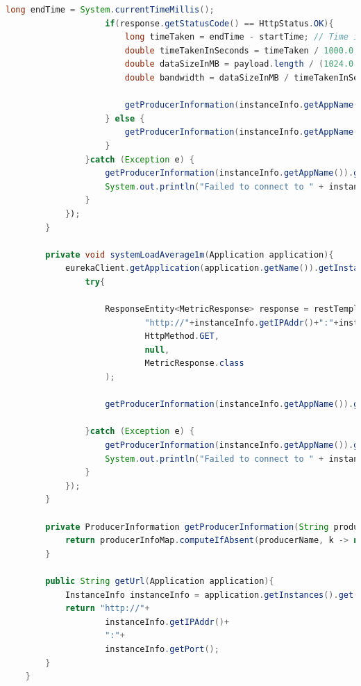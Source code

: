 \begin{lstlisting}[language=Java, caption=Kod usługi ProducerInfoService,label=ProducerInfoServiceCode]
                    long endTime = System.currentTimeMillis();
                    if(response.getStatusCode() == HttpStatus.OK){
                        long timeTaken = endTime - startTime; // Time in milliseconds
                        double timeTakenInSeconds = timeTaken / 1000.0;
                        double dataSizeInMB = payload.length / (1024.0 * 1024.0);
                        double bandwidth = dataSizeInMB / timeTakenInSeconds; // MB/s
    
                        getProducerInformation(instanceInfo.getAppName()).getMeasurementBufferConnectionSpeed().addMeasurement(bandwidth);
                    } else {
                        getProducerInformation(instanceInfo.getAppName()).getMeasurementBufferConnectionSpeed().addMeasurement(Double.MAX_VALUE);
                    }
                }catch (Exception e) {
                    getProducerInformation(instanceInfo.getAppName()).getMeasurementBufferConnectionSpeed().addMeasurement(Double.MAX_VALUE);
                    System.out.println("Failed to connect to " + instanceInfo.getIPAddr() + ":" + instanceInfo.getPort() + "-> "+e.getMessage());
                }
            });
        }
    
        private void systemLoadAverage1m(Application application){
            eurekaClient.getApplication(application.getName()).getInstances().forEach(instanceInfo -> {
                try{
    
                    ResponseEntity<MetricResponse> response = restTemplate.exchange(
                            "http://"+instanceInfo.getIPAddr()+":"+instanceInfo.getPort()+"/actuator/metrics/system.load.average.1m",
                            HttpMethod.GET,
                            null,
                            MetricResponse.class
                    );
    
                    getProducerInformation(instanceInfo.getAppName()).getMeasurementBufferSystemLoadAverage1m().addMeasurement(response.getBody().getMeasurements().get(0).getValue());
    
                }catch (Exception e) {
                    getProducerInformation(instanceInfo.getAppName()).getMeasurementBufferSystemLoadAverage1m().addMeasurement(Double.MAX_VALUE);
                    System.out.println("Failed to connect to " + instanceInfo.getIPAddr() + ":" + instanceInfo.getPort() + "-> "+e.getMessage());
                }
            });
        }
    
        private ProducerInformation getProducerInformation(String producerName) {
            return producerInfoMap.computeIfAbsent(producerName, k -> new ProducerInformation());
        }
    
        public String getUrl(Application application){
            InstanceInfo instanceInfo = application.getInstances().get(0);
            return "http://"+
                    instanceInfo.getIPAddr()+
                    ":"+
                    instanceInfo.getPort();
        }
    }

\end{lstlisting}

